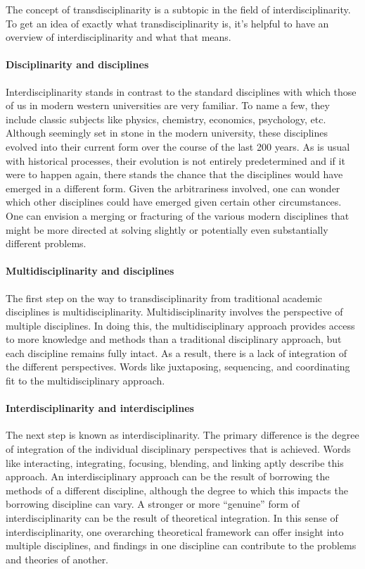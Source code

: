 \documentclass[a4paper]{article}
\begin{document}
The concept of transdisciplinarity is a subtopic in the field of
interdisciplinarity. To get an idea of exactly what transdisciplinarity is,
it’s helpful to have an overview of interdisciplinarity and what that means.

\paragraph{Disciplinarity and disciplines}

Interdisciplinarity stands in contrast to the standard disciplines with which
those of us in modern western universities are very familiar. To name a few,
they include classic subjects like physics, chemistry, economics, psychology,
etc. Although seemingly set in stone in the modern university, these
disciplines evolved into their current form over the course of the last 200
years. As is usual with historical processes, their evolution is not entirely
predetermined and if it were to happen again, there stands the chance that the
disciplines would have emerged in a different form. Given the arbitrariness
involved, one can wonder which other disciplines could have emerged given
certain other circumstances. One can envision a merging or fracturing of the
various modern disciplines that might be more directed at solving slightly or
potentially even substantially different problems. 

\paragraph{Multidisciplinarity and disciplines}

The first step on the way to transdisciplinarity from traditional academic
disciplines is multidisciplinarity. Multidisciplinarity involves the
perspective of multiple disciplines. In doing this, the multidisciplinary
approach provides access to more knowledge and methods than a traditional
disciplinary approach, but each discipline remains fully intact. As a result,
there is a lack of integration of the different perspectives. Words like
juxtaposing, sequencing, and coordinating fit to the multidisciplinary
approach. 


\paragraph{Interdisciplinarity and interdisciplines}

The next step is known as interdisciplinarity. The primary difference is the
degree of integration of the individual disciplinary perspectives that is
achieved. Words like interacting, integrating, focusing, blending, and linking
aptly describe this approach. An interdisciplinary approach can be the result
of borrowing the methods of a different discipline, although the degree to
which this impacts the borrowing discipline can vary. A stronger or more
``genuine'' form of interdisciplinarity can be the result of theoretical
integration. In this sense of interdisciplinarity, one overarching theoretical
framework can offer insight into multiple disciplines, and findings in one
discipline can contribute to the problems and theories of another.
\end{document}
